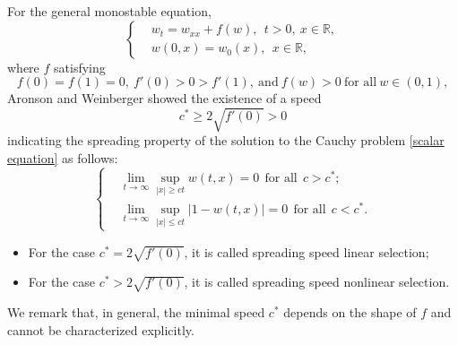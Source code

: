 \documentclass[11pt,a4paper]{article}
\numberwithin{equation}{section}
\numberwithin{figure}{section}
\begin{document}
For the general monostable equation,
\begin{equation}\label{scalar equation}
\left\{
\begin{aligned}
&w_t=w_{xx}+f(w),\ \ t>0,\ x\in\mathbb{R},\\
&w(0,x)=w_0(x),\ \ x\in\mathbb{R},
\end{aligned}
\right.
\end{equation}
where %
$f$ satisfying
\begin{equation*}
f(0)=f(1)=0,\ f'(0)>0>f'(1),\ \text{and}\ f(w)>0\ \text{for all}\ w\in(0,1),
\end{equation*}
Aronson and Weinberger \cite{Aronson Weinberger} showed the existence of a speed $$c^*\geq 2\sqrt{f'(0)}>0$$ indicating the %
spreading property
of the solution to the Cauchy problem \eqref{scalar equation}
as follows:
\begin{equation}\label{def:spreading speed}
\left\{
\begin{aligned}
&\lim_{t\to\infty}\sup_{|x|\ge ct}w(t,x)=0\ \ \mbox{for all} \ \ c>c^*;\\
&\lim_{t\to\infty}\sup_{|x|\le ct}|1-w(t,x)|=0\ \ \mbox{for all} \ \ c<c^*.
\end{aligned}
\right.
\end{equation}
\begin{itemize}
\item For the case $c^*=2\sqrt{f'(0)}$, it is called spreading speed linear selection; 
\item For the case $c^*>2\sqrt{f'(0)}$, it is called spreading speed nonlinear selection. 
\end{itemize}
We remark that, in general, the minimal speed $c^*$ depends on the shape of $f$ and cannot be characterized explicitly.
\end{document}
